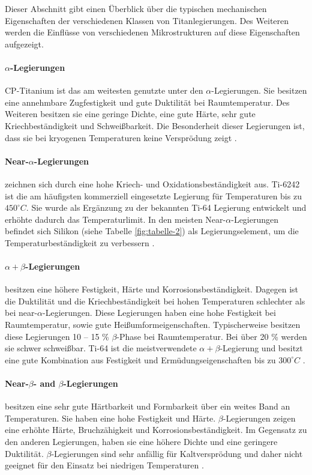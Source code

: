 Dieser Abschnitt gibt einen Überblick über die typischen mechanischen Eigenschaften der verschiedenen Klassen von Titanlegierungen. Des Weiteren werden die Einflüsse von verschiedenen Mikrostrukturen auf diese Eigenschaften aufgezeigt.

\paragraph{$\alpha$-Legierungen}  
CP-Titanium ist das am weitesten genutzte unter den $\alpha$-Legierungen. Sie besitzen eine annehmbare Zugfestigkeit und gute Duktilität bei Raumtemperatur. Des Weiteren besitzen sie eine geringe Dichte, eine gute Härte, sehr gute Kriechbeständigkeit und Schweißbarkeit. Die Besonderheit dieser Legierungen ist, dass sie bei kryogenen Temperaturen keine Versprödung zeigt \cite{C.Leyens.2005,Lutjering.2007,M.J.Donachie.2010}. 

\paragraph{Near-$\alpha$-Legierungen} 
zeichnen sich durch eine hohe Kriech- und Oxidationsbeständigkeit aus. Ti-6242 ist die am häufigsten kommerziell eingesetzte Legierung für Temperaturen bis zu $450 ^\circ C$. 
Sie wurde als Ergänzung zu der bekannten Ti-64 Legierung entwickelt und erhöhte dadurch das Temperaturlimit. In den meisten Near-$\alpha$-Legierungen befindet sich Silikon (siehe Tabelle \ref{fig:tabelle-2}) als Legierungselement, um die Temperaturbeständigkeit zu verbessern \cite{C.Leyens.2005,Lutjering.2007}. 

\paragraph{$\alpha+\beta$-Legierungen} besitzen eine höhere Festigkeit, Härte und Korrosionsbeständigkeit. Dagegen ist die Duktilität und die Kriechbeständigkeit bei hohen Temperaturen schlechter als bei near-$\alpha$-Legierungen. Diese Legierungen haben eine hohe Festigkeit bei Raumtemperatur, sowie gute Heißumformeigenschaften. Typischerweise besitzen diese Legierungen 10 -- 15 \% $\beta$-Phase bei Raumtemperatur. Bei über 20 \% werden sie schwer schweißbar. Ti-64 ist die meistverwendete $\alpha+\beta$-Legierung und besitzt eine gute Kombination aus Festigkeit und Ermüdungseigenschaften bis zu $300 ^\circ C$ \cite{Boyer.2007,M.J.Donachie.2010}. 

\paragraph{Near-$\beta$- and $\beta$-Legierungen} besitzen eine sehr gute Härtbarkeit und Formbarkeit über ein weites Band an Temperaturen. Sie haben eine hohe Festigkeit und Härte. 
$\beta$-Legierungen zeigen eine erhöhte Härte, Bruchzähigkeit und Korrosionsbeständigkeit. 
Im Gegensatz zu den anderen Legierungen, haben sie eine höhere Dichte und eine geringere Duktilität. $\beta$-Legierungen sind sehr anfällig für Kaltversprödung und daher nicht geeignet für den Einsatz bei niedrigen Temperaturen \cite{C.Leyens.2005,Lutjering.2007,M.J.Donachie.2010}. 

